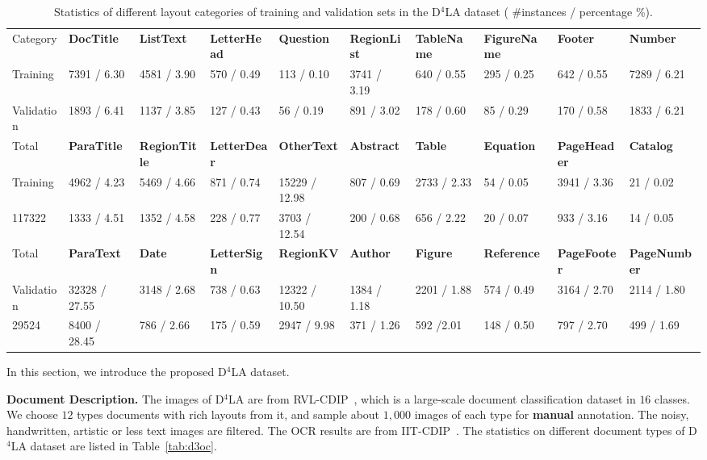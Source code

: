 \documentclass[10pt,twocolumn,letterpaper]{article}
\newcommand{\ra}[1]{\renewcommand{\arraystretch}{#1}}
\begin{document}
\begin{table*}[t]\centering
\small
\setlength{\tabcolsep}{2pt}
\ra{1.2}
\caption{Statistics of different layout categories of training and validation sets in the D$^4$LA dataset ( \#instances / percentage \%).}
\label{tab:V12_cats}
\begin{tabular}{|l|l|l|l|l|l|l|l|l|l|}
\hline
Category & \textbf{DocTitle} & \textbf{ListText} & \textbf{LetterHead} & \textbf{Question} & \textbf{RegionList}  &\textbf{TableName}  &\textbf{FigureName}  &\textbf{Footer} &\textbf{Number} \\
\cline{2-10}
Training & 7391 / 6.30 & 4581 / 3.90 & 570 / 0.49	& 113 / 0.10  & 3741 / 3.19 & 640  / 0.55 & 295 / 0.25  & 642 /  0.55 & 7289 / 6.21 \\
Validation & 1893 / 6.41 & 1137 / 3.85 & 127 / 0.43	&  56 / 0.19 & 891 / 3.02 &  178 / 0.60 & 85 / 0.29  &  170 / 0.58 &  1833 / 6.21 \\
\hline
Total & \textbf{ParaTitle} & \textbf{RegionTitle} &\textbf{LetterDear}   &\textbf{OtherText}  & \textbf{Abstract} &\textbf{Table} & \textbf{Equation}  & \textbf{PageHeader}  & \textbf{Catalog} \\
\cline{2-10}
Training  & 4962 / 4.23 & 5469 / 4.66  &   871 / 0.74 &  15229 / 12.98 & 807 / 0.69  & 2733 / 2.33  &  54 / 0.05 & 3941 /  3.36 & 21 / 0.02   \\
117322 &   1333 / 4.51 &  1352 / 4.58  &  228 / 0.77 &  3703 / 12.54  &  200 / 0.68  &  656 / 2.22  &   20 / 0.07 & 933 / 3.16  & 14 / 0.05 \\
\hline
Total & \textbf{ParaText} & \textbf{Date} &\textbf{LetterSign}   &\textbf{RegionKV}  & \textbf{Author} &\textbf{Figure} & \textbf{Reference}  & \textbf{PageFooter}  & \textbf{PageNumber} \\
\cline{2-10}
Validation & 32328 / 27.55  & 3148 / 2.68 & 738 / 0.63 	& 12322 / 10.50   & 1384 / 1.18  &  2201 / 1.88  & 574 / 0.49  & 3164 / 2.70 &  2114 / 1.80  \\
29524 & 8400 / 28.45 &  786 / 2.66 & 175 / 0.59	& 2947 / 9.98   & 371 / 1.26  & 592 /2.01 &  148 / 0.50 & 797 / 2.70 & 499 / 1.69  \\
\hline
\end{tabular}
\end{table*}

In this section, we introduce the proposed D$^4$LA dataset.


\noindent
\textbf{Document Description.}
The images of D$^4$LA are from RVL-CDIP~\cite{rvl}, which is a large-scale document classification dataset in $16$ classes.
We choose $12$ types documents with rich layouts from it,
and sample about $1,000$ images of each type for \textbf{manual} annotation.
The noisy, handwritten, artistic or less text images are filtered.
The OCR results are from IIT-CDIP~\cite{iit}.
The statistics on different document types of D$^4$LA dataset are listed in Table~\ref{tab:d3oc}.
\end{document}

